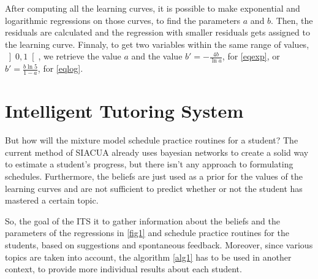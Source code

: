 \documentclass{article}
\newcommand{\0}{\mathbbold{0}}
\newcommand{\1}{\mathds{1}}
\newcommand{\openinter}[2]{\left]#1,#2\right[}
\begin{document}
After computing all the learning curves, it is possible to make exponential and logarithmic regressions on those curves, to find the parameters $a$ and $b$.
Then, the residuals are calculated and the regression with smaller residuals gets assigned to the learning curve.
Finnaly, to get two variables within the same range of values, $\openinter{0}{1}$, we retrieve the value $a$ and the value $b'=-\frac{4b}{\ln a}$, for \eqref{eqexp}, or $b'=\frac{b\ln 5}{1-a}$, for \eqref{eqlog}.
\section{Intelligent Tutoring System}
But how will the mixture model schedule practice routines for a student? The current method of SIACUA already uses bayesian networks to create a solid way to estimate a student's progress, but there isn't any approach to formulating schedules.
Furthermore, the beliefs are just used as a prior for the values of the learning curves and are not sufficient to predict whether or not the student has mastered a certain topic.

So, the goal of the ITS it to gather information about the beliefs and the parameters of the regressions in \eqref{fig1} and schedule practice routines for the students, based on suggestions and spontaneous feedback. Moreover, since various topics are taken into account, the algorithm \eqref{alg1} has to be used in another context, to provide more individual results about each student.
\end{document}
